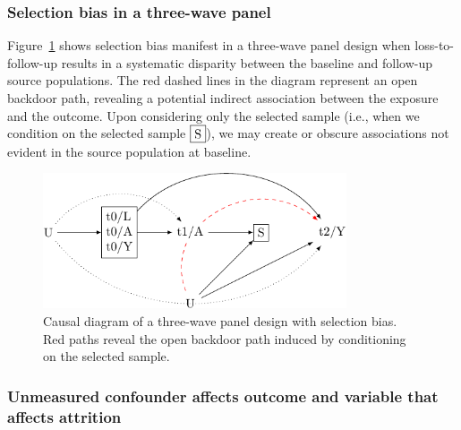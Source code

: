 \documentclass[
  singlecolumn]{article}
\begin{document}
\hypertarget{selection-bias-in-a-three-wave-panel}{%
\subsubsection{Selection bias in a three-wave
panel}\label{selection-bias-in-a-three-wave-panel}}

Figure~\ref{fig-dag-8} shows selection bias manifest in a three-wave
panel design when loss-to-follow-up results in a systematic disparity
between the baseline and follow-up source populations. The red dashed
lines in the diagram represent an open backdoor path, revealing a
potential indirect association between the exposure and the outcome.
Upon considering only the selected sample (i.e., when we condition on
the selected sample \(\framebox{S}\)), we may create or obscure
associations not evident in the source population at baseline.

\begin{figure}

{\centering \includegraphics[width=0.8\textwidth,height=\textheight]{causal-dags_files/figure-pdf/fig-dag-8-1.pdf}

}

\caption{\label{fig-dag-8}Causal diagram of a three-wave panel design
with selection bias. Red paths reveal the open backdoor path induced by
conditioning on the selected sample.}

\end{figure}

\hypertarget{unmeasured-confounder-affects-outcome-and-variable-that-affects-attrition}{%
\subsubsection{Unmeasured confounder affects outcome and variable that
affects
attrition}\label{unmeasured-confounder-affects-outcome-and-variable-that-affects-attrition}}
\end{document}
